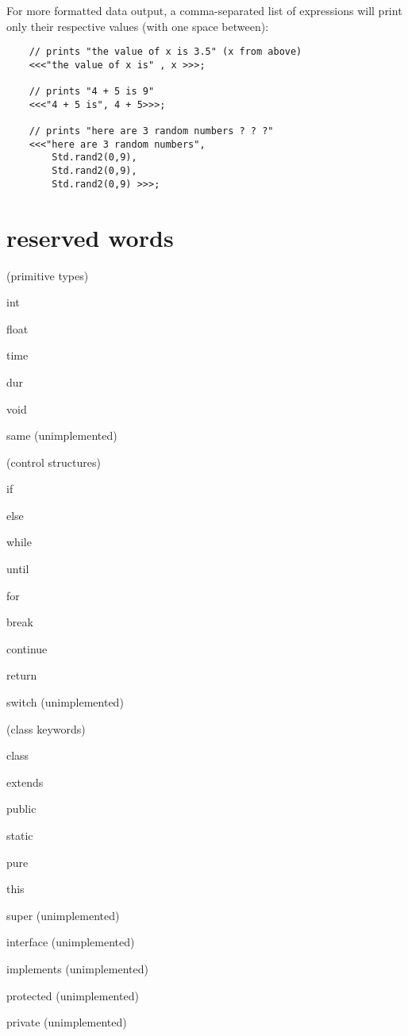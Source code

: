 For more formatted data output, a comma-separated list of expressions will print only their respective values (with one space between):
\begin{verbatim}
    // prints "the value of x is 3.5" (x from above)
    <<<"the value of x is" , x >>>;

    // prints "4 + 5 is 9"
    <<<"4 + 5 is", 4 + 5>>>;

    // prints "here are 3 random numbers ? ? ?"
    <<<"here are 3 random numbers", 
        Std.rand2(0,9), 
        Std.rand2(0,9),
        Std.rand2(0,9) >>>; 
\end{verbatim}
 

\section{reserved words}
(primitive types) 
\begin{chuckitemize}
\item int 
\item float 
\item time 
\item dur 
\item void 
\item same (unimplemented) 
\end{chuckitemize}
(control structures) 
\begin{chuckitemize}
\item if 
\item else 
\item while 
\item until 
\item for 
\item break 
\item continue 
\item return 
\item switch (unimplemented) 
\end{chuckitemize}
(class keywords) 
\begin{chuckitemize}
\item class 
\item extends 
\item public 
\item static 
\item pure 
\item this 
\item super (unimplemented) 
\item interface (unimplemented) 
\item implements (unimplemented) 
\item protected (unimplemented) 
\item private (unimplemented) 
\end{chuckitemize}
